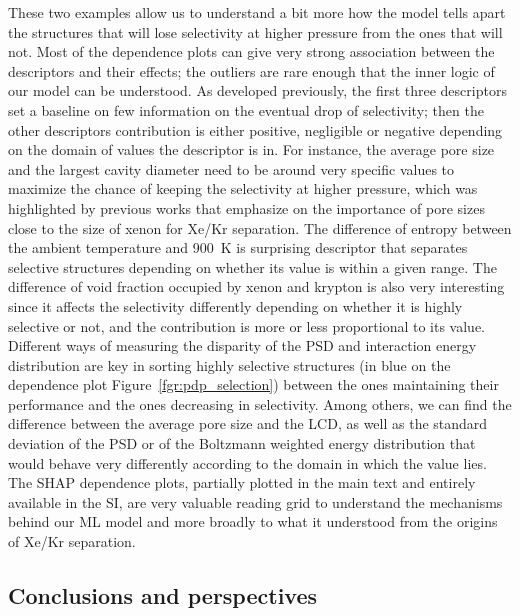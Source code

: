 \documentclass[main]{subfiles}
\begin{document}
These two examples allow us to understand a bit more how the model tells apart the structures that will lose selectivity at higher pressure from the ones that will not. Most of the dependence plots can give very strong association between the descriptors and their effects; the outliers are rare enough that the inner logic of our model can be understood. As developed previously, the first three descriptors set a baseline on few information on the eventual drop of selectivity; then the other descriptors contribution is either positive, negligible or negative depending on the domain of values the descriptor is in. For instance, the average pore size and the largest cavity diameter need to be around very specific values to maximize the chance of keeping the selectivity at higher pressure, which was highlighted by previous works that emphasize on the importance of pore sizes close to the size of xenon for Xe/Kr separation.\autocite{Simon_2015, Ren_2021} The difference of entropy between the ambient temperature and \SI{900}{\kelvin} is surprising descriptor that separates selective structures depending on whether its value is within a given range. The difference of void fraction occupied by xenon and krypton is also very interesting since it affects the selectivity differently depending on whether it is highly selective or not, and the contribution is more or less proportional to its value. Different ways of measuring the disparity of the PSD and interaction energy distribution are key in sorting highly selective structures (in blue on the dependence plot Figure~\ref{fgr:pdp_selection}) between the ones maintaining their performance and the ones decreasing in selectivity. Among others, we can find the difference between the average pore size and the LCD, as well as the standard deviation of the PSD or of the Boltzmann weighted energy distribution that would behave very differently according to the domain in which the value lies. The SHAP dependence plots, partially plotted in the main text and entirely available in the SI, are very valuable reading grid to understand the mechanisms behind our ML model and more broadly to what it understood from the origins of Xe/Kr separation.

\subsection{Conclusions and perspectives}
\end{document}
